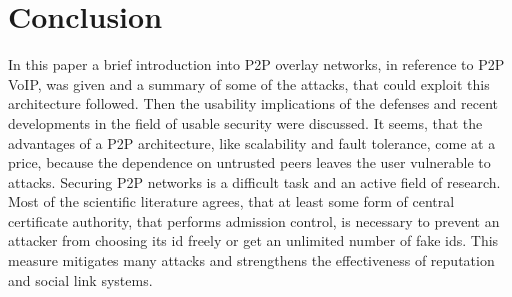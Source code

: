 \documentclass[a4paper,conference]{IEEEtran}
\begin{document}
\section{Conclusion}
\label{conclusion}
In this paper a brief introduction into P2P overlay networks, in reference to
P2P VoIP, was given and a summary of some of the attacks, that could exploit
this
architecture followed. Then the usability implications of the defenses and
recent developments in the field of usable security were discussed. It seems,
that
the advantages of a P2P architecture, like scalability and fault tolerance, come
at a price, because the dependence on untrusted peers leaves the user
vulnerable to attacks. Securing P2P networks is a difficult task and an active
field of research. Most of the scientific literature agrees, that at least
some form of central certificate authority, that performs admission control, is
necessary to prevent an attacker from choosing its id freely or get an unlimited
number of fake ids. This measure mitigates many attacks and strengthens the
effectiveness of reputation and social link systems.



%
%


\end{document}
